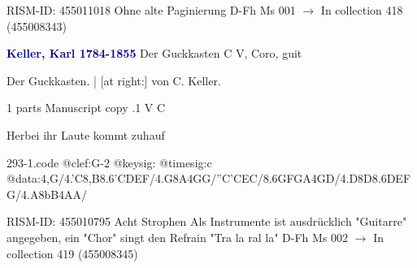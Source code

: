 \documentclass[twocolumn]{book}
\begin{document}
\newline RISM-ID: 455011018
\newline Ohne alte Paginierung
\newline D-Fh  Ms 001
\newline $\rightarrow$ In collection 418 (455008343)

\newline \par \vspace{7pt} \textcolor{darkblue}{\textbf{Keller, Karl  1784-1855}}
\newline Der Guckkasten  C  
\newline V, Coro, guit
\newline \begin{itshape}[heading, f.59v:] Der Guckkasten. | [at right:] von C. Keller.\end{itshape} 
\newline \textcolor{darkblue}{}  1 parts  
\newline Manuscript copy
.1  V  C
\newline \begin{footnotesize} Herbei ihr Laute kommt zuhauf \end{footnotesize}  
\begin{filecontents*}{293-1.code}
@clef:G-2
@keysig:
@timesig:c
@data:4,G/4.'C8,B{8.6'CD}{EF}/4.G8A4GG/''C'CEC/8.6{GF}GA4GD/4.D8D{8.6DE}{FG}/4.A8bB4AA/
\end{filecontents*}
\newline
%

\newline RISM-ID: 455010795
\newline Acht Strophen
\newline Als Instrumente ist ausdrücklich "Guitarre" angegeben, ein "Chor" singt den Refrain "Tra la ral la"
\newline D-Fh  Ms 002
\newline $\rightarrow$ In collection 419 (455008345)
\end{document}
